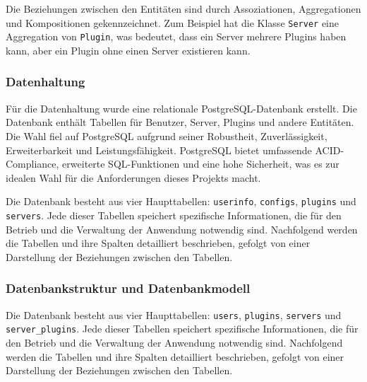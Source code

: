 Die Beziehungen zwischen den Entitäten sind durch Assoziationen, Aggregationen und Kompositionen gekennzeichnet. Zum Beispiel hat die Klasse \texttt{Server} eine Aggregation von \texttt{Plugin}, was bedeutet, dass ein Server mehrere Plugins haben kann, aber ein Plugin ohne einen Server existieren kann.

\subsubsection{Datenhaltung}\label{datenhaltung}

Für die Datenhaltung wurde eine relationale PostgreSQL-Datenbank erstellt. Die Datenbank enthält Tabellen für Benutzer, Server, Plugins und andere Entitäten. Die Wahl fiel auf PostgreSQL aufgrund seiner Robustheit, Zuverlässigkeit, Erweiterbarkeit und Leistungsfähigkeit. PostgreSQL bietet umfassende ACID-Compliance, erweiterte SQL-Funktionen und eine hohe Sicherheit, was es zur idealen Wahl für die Anforderungen dieses Projekts macht.

Die Datenbank besteht aus vier Haupttabellen: \texttt{userinfo}, \texttt{configs}, \texttt{plugins} und \texttt{servers}. Jede dieser Tabellen speichert spezifische Informationen, die für den Betrieb und die Verwaltung der Anwendung notwendig sind. Nachfolgend werden die Tabellen und ihre Spalten detailliert beschrieben, gefolgt von einer Darstellung der Beziehungen zwischen den Tabellen.

\subsubsection{Datenbankstruktur und Datenbankmodell}\label{datenbankstruktur-und-datenbankmodell}

Die Datenbank besteht aus vier Haupttabellen: \texttt{users}, \texttt{plugins}, \texttt{servers} und \texttt{server\_plugins}. Jede dieser Tabellen speichert spezifische Informationen, die für den Betrieb und die Verwaltung der Anwendung notwendig sind. Nachfolgend werden die Tabellen und ihre Spalten detailliert beschrieben, gefolgt von einer Darstellung der Beziehungen zwischen den Tabellen.
  
